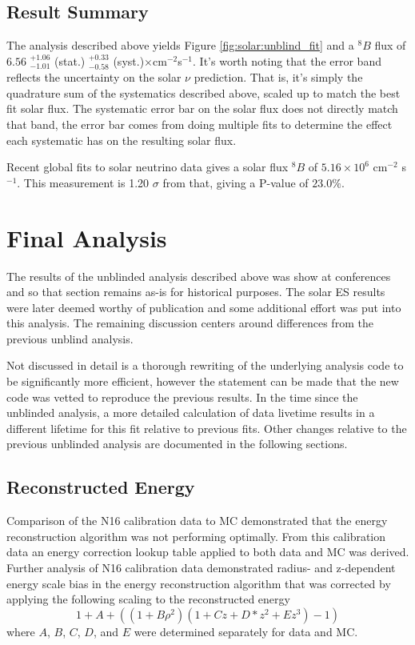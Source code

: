 \subsection{Result Summary}

The analysis described above yields Figure \ref{fig:solar:unblind_fit} and a 
$^8B$ flux of
$6.56$ $^{+1.06}_{-1.01}$ (stat.) $^{+0.33}_{-0.58}$ (syst.)$\times$cm$^{-2}$s$^{-1}$.
It's worth noting that the error band reflects the uncertainty on the solar
$\nu$ prediction.
That is, it's simply the quadrature sum of the systematics described above,
scaled up to match the best fit solar flux.
The systematic error bar on the solar flux does not directly match that band,
the error bar comes from doing multiple fits to determine the effect each systematic
has on the resulting solar flux.

Recent global fits to solar neutrino data gives a solar flux $^{8}B$ of
$5.16 \times 10^6$ cm$^{-2}$ s$^{-1}$.
This measurement is 1.20 $\sigma$ from that, giving a P-value of $23.0\%$.


\section{Final Analysis}
\label{sec:solar:updated}
The results of the unblinded analysis described above was show at conferences and so that section remains as-is for historical purposes. 
The solar ES results were later deemed worthy of publication and some additional effort was put into this analysis.
The remaining discussion centers around differences from the previous unblind analysis.

Not discussed in detail is a thorough rewriting of the underlying analysis code to be significantly more efficient, however the statement can be made that the new code was vetted to reproduce the previous results.
In the time since the unblinded analysis, a more detailed calculation of data livetime results in a different lifetime for this fit relative to previous fits.
Other changes relative to the previous unblinded analysis are documented in the following sections.


\subsection{Reconstructed Energy}
Comparison of the N16 calibration data to MC demonstrated that the energy reconstruction algorithm was not performing optimally.
From this calibration data an energy correction lookup table applied to both data and MC was derived.
Further analysis of N16 calibration data demonstrated radius- and z-dependent energy scale bias in the energy reconstruction algorithm that was corrected by applying the following scaling to the reconstructed energy
\begin{equation}
1 + A + ( (1 + B \rho^2)(1 + Cz + D*z^2 + Ez^3) - 1 )
\end{equation}
where $A$, $B$, $C$, $D$, and $E$ were determined separately for data and MC.

